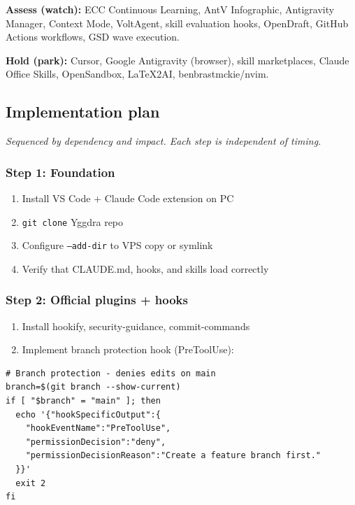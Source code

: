 \documentclass[11pt,a4paper]{article}
\begin{document}
\textbf{Assess (watch):} ECC Continuous Learning, AntV Infographic, Antigravity Manager, Context Mode, VoltAgent, skill evaluation hooks, OpenDraft, GitHub Actions workflows, GSD wave execution.

\textbf{Hold (park):} Cursor, Google Antigravity (browser), skill marketplaces, Claude Office Skills, OpenSandbox, LaTeX2AI, benbrastmckie/nvim.

\subsection{Implementation plan}

\textit{Sequenced by dependency and impact. Each step is independent of timing.}

\subsubsection{Step 1: Foundation}

\begin{enumerate}
  \item Install VS Code + Claude Code extension on PC
  \item \texttt{git clone} Yggdra repo
  \item Configure \texttt{--add-dir} to VPS copy or symlink
  \item Verify that CLAUDE.md, hooks, and skills load correctly
\end{enumerate}

\subsubsection{Step 2: Official plugins + hooks}

\begin{enumerate}[resume]
  \item Install hookify, security-guidance, commit-commands
  \item Implement branch protection hook (PreToolUse):
\end{enumerate}

\begin{lstlisting}
# Branch protection - denies edits on main
branch=$(git branch --show-current)
if [ "$branch" = "main" ]; then
  echo '{"hookSpecificOutput":{
    "hookEventName":"PreToolUse",
    "permissionDecision":"deny",
    "permissionDecisionReason":"Create a feature branch first."
  }}'
  exit 2
fi
\end{lstlisting}
\end{document}
